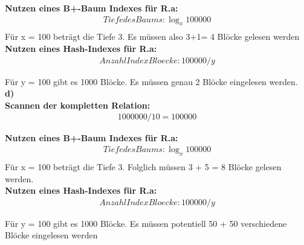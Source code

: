 \documentclass[12pt]{article}
\begin{document}
\noindent \textbf{Nutzen eines B+-Baum Indexes für R.a:}
\begin{align*}
	Tiefe des Baums:  \log_{x}100000 \\
\end{align*}
Für x = 100 beträgt die Tiefe 3. Es müssen also 3+1= 4 Blöcke gelesen werden\\


\noindent \textbf{Nutzen eines Hash-Indexes für R.a: }
\begin{align*}
	Anzahl Index Bloecke: 100000 / y   
\end{align*}

\noindent
Für y = 100 gibt es 1000 Blöcke.
Es müssen genau 2 Blöcke eingelesen werden.\\


\noindent \textbf{d)} \\
\textbf{Scannen der kompletten Relation:}
\begin{align*}
	1000000 / 10 = 100000 
\end{align*}

\noindent \textbf{Nutzen eines B+-Baum Indexes für R.a:}
\begin{align*}
	Tiefe des Baums:  \log_{x}100000 \\
\end{align*}
Für x = 100 beträgt die Tiefe 3. Folglich müssen 3 + 5   = 8 Blöcke gelesen werden.\\


\noindent \textbf{Nutzen eines Hash-Indexes für R.a:}
\begin{align*}
	Anzahl Index Bloecke: 100000 / y   
\end{align*}

\noindent Für y = 100 gibt es 1000 Blöcke.
Es müssen potentiell 50 + 50 verschiedene Blöcke eingelesen werden
\end{document}
